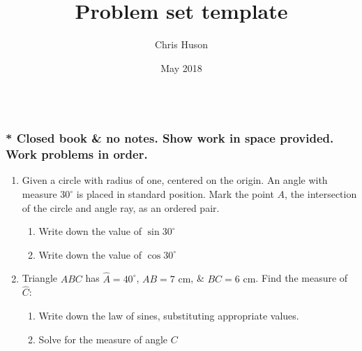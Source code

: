 \documentclass[12pt, oneside]{article}
\title{Problem set template}
\author{Chris Huson}
\date{May 2018}
\begin{document}

\subsubsection*{\\* \textnormal{Closed book \& no notes. Show work in space provided. Work problems in order.}}

\begin{enumerate}

\item Given a circle with radius of one, centered on the origin. An angle with measure $30^\circ$ is placed in standard position. Mark the point $A$, the intersection of the circle and angle ray, as an ordered pair.
\begin{center}
\end{center}
\begin{enumerate}
      \item Write down the value of $\sin{30^\circ}$\\[0.25in]
      \item  Write down the value of $\cos{30^\circ}$\\[0.25in]
\end{enumerate}


\item Triangle $ABC$ has $\hat{A}=40^\circ$, $AB=7 \text{ cm}$, \& $BC=6 \text{ cm}$. Find the measure of $\hat{C}$:
\begin{enumerate}
      \item Write down the law of sines, substituting appropriate values.\\[0.5in]
      \item Solve for the measure of angle $C$
\end{enumerate}
\begin{center}
\end{center}



\end{enumerate}
\end{document}
